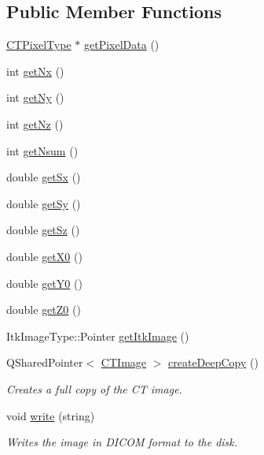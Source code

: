 \subsection*{Public Member Functions}
\begin{DoxyCompactItemize}
\item 
\hyperlink{classctimage_1_1_c_t_image_ab3bf32a276d168a705973d8d6c698cec}{CTPixelType} $\ast$ \hyperlink{classctimage_1_1_c_t_image_a6878ee1b7181be6227408fe453c8ac8b}{getPixelData} ()
\item 
int \hyperlink{classctimage_1_1_c_t_image_a877fb3bce920ba1bb352491c50b4d168}{getNx} ()
\item 
int \hyperlink{classctimage_1_1_c_t_image_a031a3229e2354a57490312c154c3b0db}{getNy} ()
\item 
int \hyperlink{classctimage_1_1_c_t_image_a005e1a22619e37ee6ed2515911e1ab1d}{getNz} ()
\item 
int \hyperlink{classctimage_1_1_c_t_image_a62f2e4428c651f31febc96b10f189632}{getNsum} ()
\item 
double \hyperlink{classctimage_1_1_c_t_image_a544abec0ed785ab4b42cccf11c59dc98}{getSx} ()
\item 
double \hyperlink{classctimage_1_1_c_t_image_aefac72b6ce49db1ce878103adbe9eb6a}{getSy} ()
\item 
double \hyperlink{classctimage_1_1_c_t_image_a26e2a9db85e602f43f2a86ae34504436}{getSz} ()
\item 
double \hyperlink{classctimage_1_1_c_t_image_ab1cae0aaaf707edb3b4dd1bb86093076}{getX0} ()
\item 
double \hyperlink{classctimage_1_1_c_t_image_a66a56ee2161af9eba00cff98cb2d07dd}{getY0} ()
\item 
double \hyperlink{classctimage_1_1_c_t_image_a6317b268b24347587a430adb34b767cb}{getZ0} ()
\item 
ItkImageType::Pointer \hyperlink{classctimage_1_1_c_t_image_a56db4348cfa2c01d80b9cfd4aea7ef73}{getItkImage} ()
\item 
QSharedPointer$<$ \hyperlink{classctimage_1_1_c_t_image}{CTImage} $>$ \hyperlink{classctimage_1_1_c_t_image_aa80c85e696bdad6bdeebad7c4ca01d76}{createDeepCopy} ()
\begin{DoxyCompactList}\small\item\em Creates a full copy of the CT image. \item\end{DoxyCompactList}\item 
void \hyperlink{classctimage_1_1_c_t_image_a3f3dfc3759b0fbdd2bc2eedffbe5546a}{write} (string)
\begin{DoxyCompactList}\small\item\em Writes the image in DICOM format to the disk. \item\end{DoxyCompactList}\end{DoxyCompactItemize}
